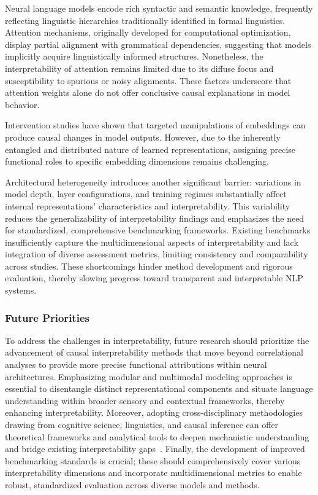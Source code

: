 \documentclass[sigconf]{acmart}
\begin{document}
Neural language models encode rich syntactic and semantic knowledge, frequently reflecting linguistic hierarchies traditionally identified in formal linguistics. Attention mechanisms, originally developed for computational optimization, display partial alignment with grammatical dependencies, suggesting that models implicitly acquire linguistically informed structures. Nonetheless, the interpretability of attention remains limited due to its diffuse focus and susceptibility to spurious or noisy alignments. These factors underscore that attention weights alone do not offer conclusive causal explanations in model behavior.

Intervention studies have shown that targeted manipulations of embeddings can produce causal changes in model outputs. However, due to the inherently entangled and distributed nature of learned representations, assigning precise functional roles to specific embedding dimensions remains challenging.

Architectural heterogeneity introduces another significant barrier: variations in model depth, layer configurations, and training regimes substantially affect internal representations' characteristics and interpretability. This variability reduces the generalizability of interpretability findings and emphasizes the need for standardized, comprehensive benchmarking frameworks. Existing benchmarks insufficiently capture the multidimensional aspects of interpretability and lack integration of diverse assessment metrics, limiting consistency and comparability across studies. These shortcomings hinder method development and rigorous evaluation, thereby slowing progress toward transparent and interpretable NLP systems.

\subsubsection{Future Priorities}

To address the challenges in interpretability, future research should prioritize the advancement of causal interpretability methods that move beyond correlational analyses to provide more precise functional attributions within neural architectures. Emphasizing modular and multimodal modeling approaches is essential to disentangle distinct representational components and situate language understanding within broader sensory and contextual frameworks, thereby enhancing interpretability. Moreover, adopting cross-disciplinary methodologies drawing from cognitive science, linguistics, and causal inference can offer theoretical frameworks and analytical tools to deepen mechanistic understanding and bridge existing interpretability gaps~\cite{ref36}. Finally, the development of improved benchmarking standards is crucial; these should comprehensively cover various interpretability dimensions and incorporate multidimensional metrics to enable robust, standardized evaluation across diverse models and methods.
\end{document}
